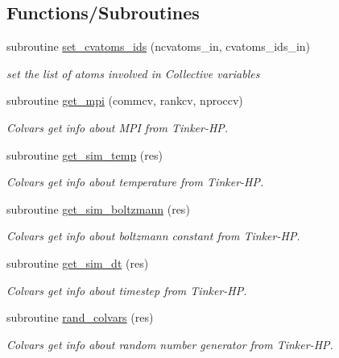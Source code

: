 \subsection*{Functions/\-Subroutines}
\begin{DoxyCompactItemize}
\item 
subroutine \hyperlink{MOD__colvars_8f90_a76a1b8118cd78c445a6e7288a8cffafb}{set\-\_\-cvatoms\-\_\-ids} (ncvatoms\-\_\-in, cvatoms\-\_\-ids\-\_\-in)
\begin{DoxyCompactList}\small\item\em set the list of atoms involved in Collective variables \end{DoxyCompactList}\item 
subroutine \hyperlink{MOD__colvars_8f90_a1f86db35dd45f2e41a1d94e8f5d44106}{get\-\_\-mpi} (commcv, rankcv, nproccv)
\begin{DoxyCompactList}\small\item\em Colvars get info about M\-P\-I from Tinker-\/\-H\-P. \end{DoxyCompactList}\item 
subroutine \hyperlink{MOD__colvars_8f90_aef0008c8ec9f56ddb9bc7d229902186e}{get\-\_\-sim\-\_\-temp} (res)
\begin{DoxyCompactList}\small\item\em Colvars get info about temperature from Tinker-\/\-H\-P. \end{DoxyCompactList}\item 
subroutine \hyperlink{MOD__colvars_8f90_a77c8658d492b8ca19a774de6f2453954}{get\-\_\-sim\-\_\-boltzmann} (res)
\begin{DoxyCompactList}\small\item\em Colvars get info about boltzmann constant from Tinker-\/\-H\-P. \end{DoxyCompactList}\item 
subroutine \hyperlink{MOD__colvars_8f90_a48f9b008992bab14a5917d6363246827}{get\-\_\-sim\-\_\-dt} (res)
\begin{DoxyCompactList}\small\item\em Colvars get info about timestep from Tinker-\/\-H\-P. \end{DoxyCompactList}\item 
subroutine \hyperlink{MOD__colvars_8f90_ab6bf8d79bf25cc8f3f2b542769caf9a5}{rand\-\_\-colvars} (res)
\begin{DoxyCompactList}\small\item\em Colvars get info about random number generator from Tinker-\/\-H\-P. \end{DoxyCompactList}\item 

\end{DoxyCompactItemize}
